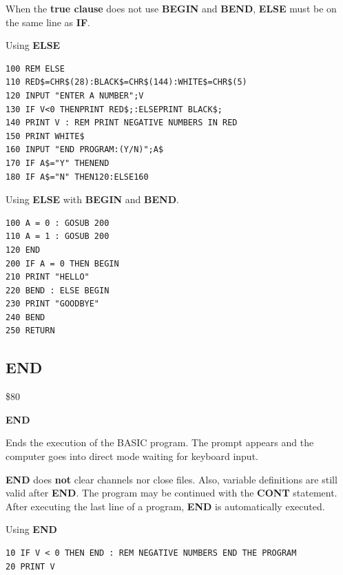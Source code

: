 \begin{description}[leftmargin=2cm,style=nextline]
               When the {\bf true clause} does not use {\bf BEGIN} and {\bf BEND},
               {\bf ELSE} must be on the same line as {\bf IF}.
\item [Example:]
                Using {\bf ELSE}
\begin{tcolorbox}[colback=black,coltext=white]
\verbatimfont{\codefont}
\begin{verbatim}
100 REM ELSE
110 RED$=CHR$(28):BLACK$=CHR$(144):WHITE$=CHR$(5)
120 INPUT "ENTER A NUMBER";V
130 IF V<0 THENPRINT RED$;:ELSEPRINT BLACK$;
140 PRINT V : REM PRINT NEGATIVE NUMBERS IN RED
150 PRINT WHITE$
160 INPUT "END PROGRAM:(Y/N)";A$
170 IF A$="Y" THENEND
180 IF A$="N" THEN120:ELSE160
\end{verbatim}
\end{tcolorbox}
                Using {\bf ELSE} with {\bf BEGIN} and {\bf BEND}.
\begin{tcolorbox}[colback=black,coltext=white]
\verbatimfont{\codefont}
\begin{verbatim}
100 A = 0 : GOSUB 200
110 A = 1 : GOSUB 200
120 END
200 IF A = 0 THEN BEGIN
210 PRINT "HELLO"
220 BEND : ELSE BEGIN
230 PRINT "GOODBYE"
240 BEND
250 RETURN
\end{verbatim}
\end{tcolorbox}
\end{description}



\newpage
\subsection{END}
\begin{description}[leftmargin=2cm,style=nextline]
\item [Token:] \$80
\item [Format:] {\bf END}
\item [Usage:] Ends the execution
               of the BASIC program. The  prompt
               appears and the computer goes into direct mode
               waiting for keyboard input.

\item [Remarks:]
               {\bf END} does {\bf not} clear channels nor close files.
               Also, variable definitions are still valid after {\bf END}.
               The program may be continued with the {\bf CONT}
               statement. After executing the last line of a
               program, {\bf END} is automatically executed.


\item [Example:]
                Using {\bf END}
\begin{tcolorbox}[colback=black,coltext=white]
\verbatimfont{\codefont}
\begin{verbatim}
10 IF V < 0 THEN END : REM NEGATIVE NUMBERS END THE PROGRAM
20 PRINT V
\end{verbatim}
\end{tcolorbox}
\end{description}

